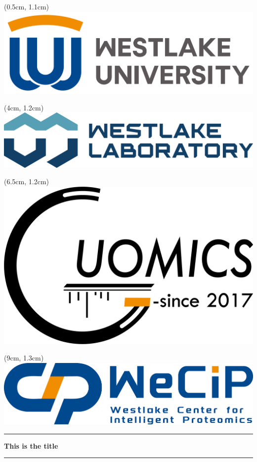 \documentclass[11pt,a4paper]{article}
\newcommand{\HRule}[1]{\rule{\linewidth}{#1}}
\begin{document}
\begin{titlepage}
    \thispagestyle{fancy}
    \fancyfoot[C]{\thepage}
    \centering
    \begin{textblock*}{5cm}(0.5cm, 1.1cm) 
        \noindent 
        \includegraphics[width=0.6\linewidth]{figures/logo.png} 
    \end{textblock*} 
    \begin{textblock*}{5cm}(4cm, 1.2cm) 
        \noindent 
        \includegraphics[width=0.7\linewidth]{figures/westlakelab.png}
    \end{textblock*}
    \begin{textblock*}{5cm}(6.5cm, 1.2cm) 
        \noindent
        \includegraphics[width=0.28\linewidth]{figures/guomics.png}
    \end{textblock*}
    \begin{textblock*}{5cm}(9cm, 1.3cm) 
        \noindent
        \includegraphics[width=0.6\linewidth]{figures/WeCIP.png}
    \end{textblock*}
    \vspace*{10pt} 
    \HRule{1pt} 
    \begin{center}
    \parbox{\linewidth}{\centering\Huge\textbf{This is the title}}
    \end{center}
    \HRule{2pt}
    \vspace{2pt}
    

\end{titlepage}
\end{document}
